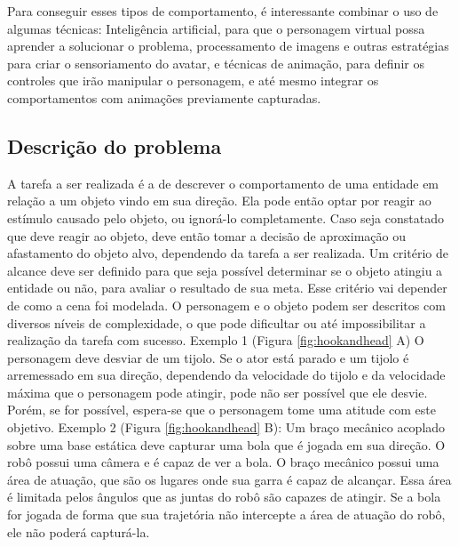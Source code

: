 \documentclass{article}
\begin{document}
Para conseguir esses tipos de comportamento, é interessante combinar o uso de algumas técnicas: Inteligência artificial, para que o personagem virtual possa aprender a solucionar o problema, processamento de imagens e outras estratégias para criar o sensoriamento do avatar, e técnicas de animação, para definir os controles que irão manipular o personagem, e até mesmo integrar os comportamentos com animações previamente capturadas.

\subsection{Descrição do problema}

A tarefa a ser realizada é a de descrever o comportamento de uma entidade em relação a um objeto vindo em sua direção. Ela pode então optar por reagir ao estímulo causado pelo objeto, ou ignorá-lo completamente. Caso seja constatado que deve reagir ao objeto, deve então tomar a decisão de aproximação ou afastamento do objeto alvo, dependendo da tarefa a ser realizada. 
Um critério de alcance deve ser definido para que seja possível determinar se o objeto atingiu a entidade ou não, para avaliar o resultado de sua meta. Esse critério vai depender de como a cena foi modelada. O personagem e o objeto podem ser descritos com diversos níveis de complexidade, o que pode dificultar ou até impossibilitar a realização da tarefa com sucesso.
	Exemplo 1 (Figura \ref{fig:hookandhead} A) O personagem deve desviar de um tijolo. Se o ator está parado e um tijolo é arremessado em sua direção, dependendo da velocidade do tijolo e da velocidade máxima que o personagem pode atingir, pode não ser possível que ele desvie. Porém, se for possível, espera-se que o personagem tome uma atitude com este objetivo.
	Exemplo 2 (Figura \ref{fig:hookandhead} B): Um braço mecânico acoplado sobre uma base estática deve capturar uma bola que é jogada em sua direção. O robô possui uma câmera e é capaz de ver a bola. O braço mecânico possui uma área de atuação, que são os lugares onde sua garra é capaz de alcançar. Essa área é limitada pelos ângulos que as juntas do robô são capazes de atingir. Se a bola for jogada de forma que sua trajetória não intercepte a área de atuação do robô, ele não poderá capturá-la. \cite{bib:2011:Hamon}
	
\end{document}
